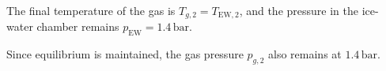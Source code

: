 The final temperature of the gas is \( T_{g,2} = T_{\text{EW},2} \), and the pressure in the ice-water chamber remains \( p_{\text{EW}} = 1.4 \, \text{bar} \).  

Since equilibrium is maintained, the gas pressure \( p_{g,2} \) also remains at \( 1.4 \, \text{bar} \).